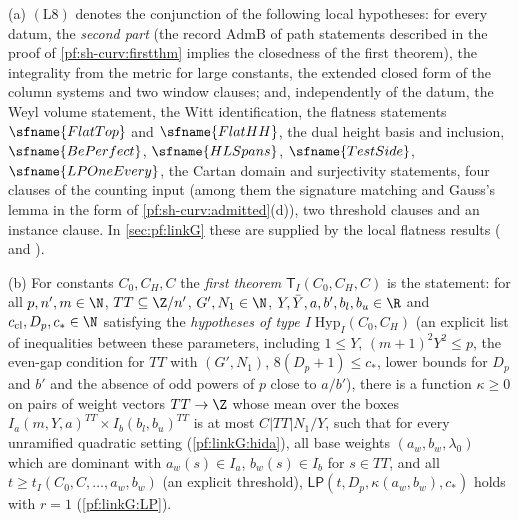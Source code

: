 \begin{definition}\label{pf:sh-curv:L8def}
(a) $(\mathrm{L}8)$ denotes the conjunction of the following local hypotheses: for every datum,
the \emph{second part} (the record $\mathrm{AdmB}$ of path statements described in the proof of \cref{pf:sh-curv:firstthm}
implies the closedness of the first theorem), the integrality from the metric for large constants, the extended closed form
of the column systems and two window clauses; and, independently of the datum, the Weyl volume statement, the Witt
identification, the flatness statements $\sfname{FlatTop}$ and $\sfname{FlatHH}$, the dual height basis and inclusion,
$\sfname{BePerfect}$, $\sfname{HLSpans}$, $\sfname{TestSide}$, $\sfname{LPOneEvery}$, the Cartan domain and surjectivity
statements, four clauses of the counting input (among them the signature matching and Gauss's lemma in the form of
\cref{pf:sh-curv:admitted}(d)), two threshold clauses and an instance clause. In \cref{sec:pf:linkG} these are supplied by
the local flatness results ( and ).

(b) For constants $C_0,C_H,C$ the \emph{first theorem} $\mathsf T_I(C_0,C_H,C)$ is the statement: for all
$p,n',m\in\N$, $TT\subseteq\Z/n'$, $G',N_1\in\N$, $Y,\bar Y,a,b',b_l,b_u\in\R$ and $c_{\mathrm{cl}},D_p,c_*\in\N$ satisfying
the \emph{hypotheses of type I} $\mathrm{Hyp}_I(C_0,C_H)$ (an explicit list of inequalities between these parameters,
including $1\le Y$, $(m+1)^2Y^2\le p$, the even-gap condition for $TT$ with $(G',N_1)$, $8(D_p+1)\le c_*$, lower bounds for
$D_p$ and $b'$ and the absence of odd powers of $p$ close to $a/b'$), there is a function $\kappa\ge0$ on pairs of weight
vectors $TT\to\Z$ whose mean over the boxes $I_a(m,Y,a)^{TT}\times I_b(b_l,b_u)^{TT}$ is at most $C|TT|N_1/Y$, such that
for every unramified quadratic setting (\cref{pf:linkG:hida}), all base weights $(a_w,b_w,\lambda_0)$ which are dominant
with $a_w(s)\in I_a$, $b_w(s)\in I_b$ for $s\in TT$, and all $t\ge t_I(C_0,C,\dots,a_w,b_w)$ (an explicit threshold),
$\mathsf{LP}(t,D_p,\kappa(a_w,b_w),c_*)$ holds with $r=1$ (\cref{pf:linkG:LP}).
\end{definition}

